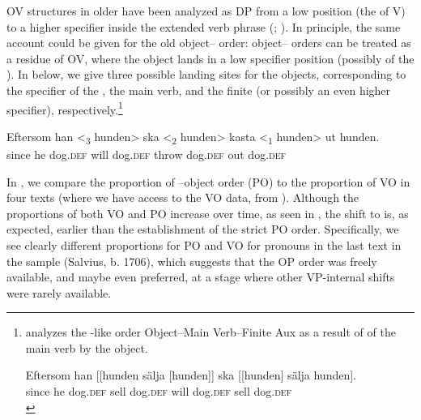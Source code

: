 \documentclass[output=paper]{langscibook}
\begin{document}
OV structures in older  have been analyzed as DP  from a low  position (the  of V) to a higher specifier inside the extended verb phrase (\citealt{Delsing1999}; \citealt{Petzell2011, Petzell2012}). In principle, the same account could be given for the old object– order: object– orders can be treated as a residue of OV, where the object lands in a low specifier position (possibly of the ). In  below, we give three possible landing sites for the objects, corresponding to the specifier of the , the main verb, and the finite  (or possibly an even higher specifier), respectively.\footnote{\citet{Petzell2012} analyzes the -like order Object–Main Verb–Finite Aux as a result of  of the main verb by the object.

    \ea
    \gll  Eftersom    han [[hunden   sälja [hunden]]   ska [[hunden]   sälja   hunden].\\
    since   he     dog.\textsc{def}   sell       dog.\textsc{def}     will   dog.\textsc{def}     sell   dog.\textsc{def}\\
    \z}


\ea\label{ex:lalu:46}
\gll Eftersom  han {<\textsubscript{3} hunden>}   ska   {<\textsubscript{2} hunden>} kasta     {<\textsubscript{1} hunden>}   ut     hunden.\\
since        he      dog\textsc{.def}  will     dog\textsc{.def}  throw        dog\textsc{.def}   out   dog\textsc{.def}\\
\z


In , we compare the proportion of –object order (PO) to the proportion of VO in four texts (where we have access to the VO data, from \citealt{Petzell2012}). Although the proportions of both VO and PO increase over time, as seen in , the shift to  is, as expected, earlier than the establishment of the strict PO order. Specifically, we see clearly different proportions for PO and VO for pronouns in the last text in the sample (Salvius, b. 1706), which suggests that the OP order was freely available, and maybe even preferred, at a stage where other VP-internal shifts were rarely available.\largerpage
\end{document}

